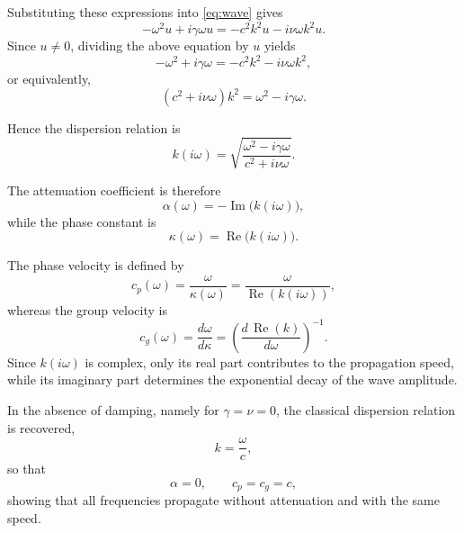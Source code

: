 \documentclass{Configuration_Files/PoliMi3i_thesis}
\begin{document}
Substituting these expressions into \eqref{eq:wave} gives
\begin{equation*}
-\omega^2u
+i\gamma\omega u
=
-c^2k^2u
-i\nu\omega k^2u.
\end{equation*}
Since \(u\neq0\), dividing the above equation by \(u\) yields
\begin{equation*}
-\omega^2+i\gamma\omega
=
-c^2k^2-i\nu\omega k^2,
\end{equation*}
or equivalently,
\begin{equation}
\label{eq:dispersion}
(c^2+i\nu\omega)k^2
=
\omega^2-i\gamma\omega.
\end{equation}

Hence the dispersion relation is
\begin{equation*}
k(i\omega)
=
\sqrt{
\frac{\omega^2-i\gamma\omega}
     {c^2+i\nu\omega}
}.
\end{equation*}

The attenuation coefficient is therefore
\begin{equation*}
\alpha(\omega)
=
-\operatorname{Im}\!\bigl(k(i\omega)\bigr),
\end{equation*}
while the phase constant is
\begin{equation*}
\kappa(\omega)
=
\operatorname{Re}\!\bigl(k(i\omega)\bigr).
\end{equation*}

The phase velocity is defined by
\begin{equation*}
c_p(\omega)
=
\frac{\omega}{\kappa(\omega)}
=
\frac{\omega}
{\operatorname{Re}(k(i\omega))},
\end{equation*}
whereas the group velocity is
\begin{equation*}
c_g(\omega)
=
\frac{d\omega}{d\kappa}
=
\left(
\frac{d\,\operatorname{Re}(k)}
     {d\omega}
\right)^{-1}.
\end{equation*}
Since \(k(i\omega)\) is complex, only its real part contributes to the propagation speed, while its imaginary part determines the exponential decay of the wave amplitude.

In the absence of damping, namely for \(\gamma=\nu=0\), the classical dispersion relation is recovered,
\begin{equation*}
k=\frac{\omega}{c},
\end{equation*}
so that
\begin{equation*}
\alpha=0,
\qquad
c_p=c_g=c,
\end{equation*}
showing that all frequencies propagate without attenuation and with the same speed.
\end{document}

